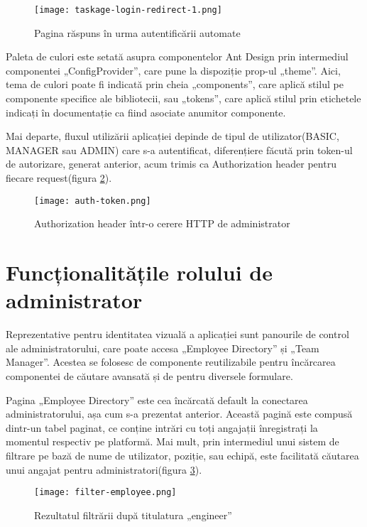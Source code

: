  \begin{figure}[H]
	\centering
 	\texttt{[image: taskage-login-redirect-1.png]}
	\caption{Pagina răspuns în urma autentificării automate}
	\label{fig:taskage-login-auto}
 \end{figure}

Paleta de culori este setată asupra componentelor Ant Design prin intermediul componentei „ConfigProvider”, care pune la dispoziție prop-ul „theme”. Aici, tema de culori poate fi indicată prin cheia „components”, care aplică stilul pe componente specifice ale bibliotecii, sau „tokens”, care aplică stilul prin etichetele indicați în documentație ca fiind asociate anumitor componente.

Mai departe, fluxul utilizării aplicației depinde de tipul de utilizator(BASIC, MANAGER sau ADMIN) care s-a autentificat, diferențiere făcută prin token-ul de autorizare, generat anterior, acum trimis ca Authorization header pentru fiecare request(figura \ref{fig:auth-token}).

 \begin{figure}[H]
	\centering
 	\texttt{[image: auth-token.png]}
	\caption{Authorization header într-o cerere HTTP de administrator}
	\label{fig:auth-token}
 \end{figure}

\section{Funcționalitățile rolului de administrator}

Reprezentative pentru identitatea vizuală a aplicației sunt panourile de control ale administratorului, care poate accesa „Employee Directory” și „Team Manager”. Acestea se folosesc de componente reutilizabile pentru încărcarea componentei de căutare avansată și de pentru diversele formulare.

Pagina „Employee Directory” este cea încărcată default la conectarea administratorului, așa cum s-a prezentat anterior. Această pagină este compusă dintr-un tabel paginat, ce conține intrări cu toți angajații înregistrați la momentul respectiv pe platformă. Mai mult, prin intermediul unui sistem de filtrare pe bază de nume de utilizator, poziție, sau echipă, este facilitată căutarea unui angajat pentru administratori(figura \ref{fig:filter-employee}).

 \begin{figure}[H]
	\centering
 	\texttt{[image: filter-employee.png]}
	\caption{Rezultatul filtrării după titulatura „engineer”}
	\label{fig:filter-employee}
 \end{figure}

